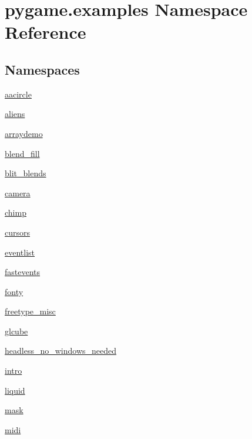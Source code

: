 \hypertarget{namespacepygame_1_1examples}{}\section{pygame.\+examples Namespace Reference}
\label{namespacepygame_1_1examples}
\subsection*{Namespaces}
\begin{DoxyCompactItemize}
\item 
 \hyperlink{namespacepygame_1_1examples_1_1aacircle}{aacircle}
\item 
 \hyperlink{namespacepygame_1_1examples_1_1aliens}{aliens}
\item 
 \hyperlink{namespacepygame_1_1examples_1_1arraydemo}{arraydemo}
\item 
 \hyperlink{namespacepygame_1_1examples_1_1blend__fill}{blend\+\_\+fill}
\item 
 \hyperlink{namespacepygame_1_1examples_1_1blit__blends}{blit\+\_\+blends}
\item 
 \hyperlink{namespacepygame_1_1examples_1_1camera}{camera}
\item 
 \hyperlink{namespacepygame_1_1examples_1_1chimp}{chimp}
\item 
 \hyperlink{namespacepygame_1_1examples_1_1cursors}{cursors}
\item 
 \hyperlink{namespacepygame_1_1examples_1_1eventlist}{eventlist}
\item 
 \hyperlink{namespacepygame_1_1examples_1_1fastevents}{fastevents}
\item 
 \hyperlink{namespacepygame_1_1examples_1_1fonty}{fonty}
\item 
 \hyperlink{namespacepygame_1_1examples_1_1freetype__misc}{freetype\+\_\+misc}
\item 
 \hyperlink{namespacepygame_1_1examples_1_1glcube}{glcube}
\item 
 \hyperlink{namespacepygame_1_1examples_1_1headless__no__windows__needed}{headless\+\_\+no\+\_\+windows\+\_\+needed}
\item 
 \hyperlink{namespacepygame_1_1examples_1_1intro}{intro}
\item 
 \hyperlink{namespacepygame_1_1examples_1_1liquid}{liquid}
\item 
 \hyperlink{namespacepygame_1_1examples_1_1mask}{mask}
\item 
 \hyperlink{namespacepygame_1_1examples_1_1midi}{midi}

\end{DoxyCompactItemize}
